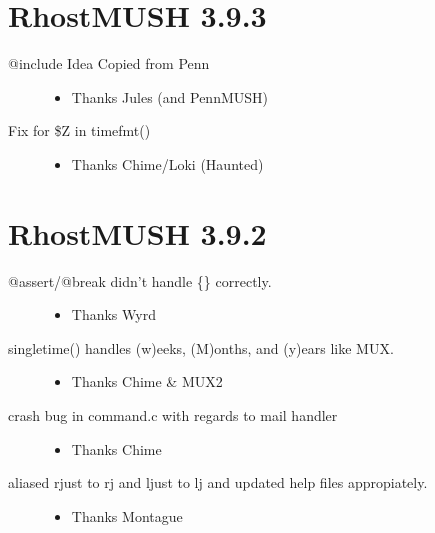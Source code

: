 \documentclass[letterpaper,10pt,english]{sphinxmanual}
\begin{document}
\section{RhostMUSH 3.9.3}
\label{\detokenize{changelog:rhostmush-3-9-3}}\label{\detokenize{changelog:changelog-3-9-3}}\begin{description}
\item[{@include \textendash{} Idea Copied from Penn}] \leavevmode\begin{itemize}
\item {} 
\sphinxAtStartPar
Thanks Jules (and PennMUSH)

\end{itemize}

\item[{Fix for \$Z in timefmt()}] \leavevmode\begin{itemize}
\item {} 
\sphinxAtStartPar
Thanks Chime/Loki (Haunted)

\end{itemize}

\end{description}


\section{RhostMUSH 3.9.2}
\label{\detokenize{changelog:rhostmush-3-9-2}}\label{\detokenize{changelog:changelog-3-9-2}}\begin{description}
\item[{@assert/@break didn’t handle \{\} correctly.}] \leavevmode\begin{itemize}
\item {} 
\sphinxAtStartPar
Thanks Wyrd

\end{itemize}

\item[{singletime() handles (w)eeks, (M)onths, and (y)ears like MUX.}] \leavevmode\begin{itemize}
\item {} 
\sphinxAtStartPar
Thanks Chime \& MUX2

\end{itemize}

\item[{crash bug in command.c with regards to mail handler}] \leavevmode\begin{itemize}
\item {} 
\sphinxAtStartPar
Thanks Chime

\end{itemize}

\item[{aliased rjust to rj and ljust to lj and updated help files appropiately.}] \leavevmode\begin{itemize}
\item {} 
\sphinxAtStartPar
Thanks Montague

\end{itemize}

\end{description}
\end{document}
